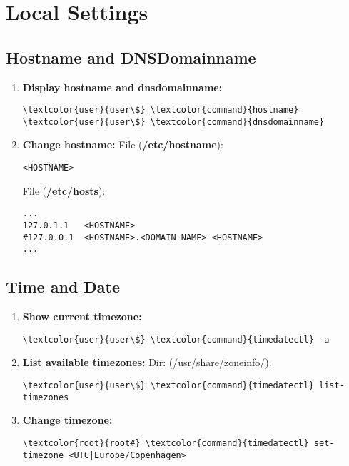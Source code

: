 \documentclass[10pt, a4paper, onecolumn, openany]{book} %
\begin{document}
\chapter{Local Settings}
\section{Hostname and DNSDomainname}
\begin{enumerate}
    \item \textbf{Display hostname and dnsdomainname:}
\begin{Verbatim}[commandchars=\\\{\}]
\textcolor{user}{user\$} \textcolor{command}{hostname}
\textcolor{user}{user\$} \textcolor{command}{dnsdomainname}
\end{Verbatim}
    \item \textbf{Change hostname:}
\newline File (\textbf{\textcolor{file}{/etc/hostname}}):
\begin{Verbatim}[commandchars=\\\{\}]
<HOSTNAME>
\end{Verbatim}
File (\textbf{\textcolor{file}{/etc/hosts}}):
\begin{Verbatim}[commandchars=\\\{\}]
...
127.0.1.1   <HOSTNAME>
#127.0.0.1  <HOSTNAME>.<DOMAIN-NAME> <HOSTNAME>
...
\end{Verbatim}
\end{enumerate}
\section{Time and Date}
\begin{enumerate}
    \item \textbf{Show current timezone:}
\begin{Verbatim}[commandchars=\\\{\}]
\textcolor{user}{user\$} \textcolor{command}{timedatectl} -a
\end{Verbatim}
    \item \textbf{List available timezones:}
    \newline Dir: (\textcolor{dir}{/usr/share/zoneinfo/}).
\begin{Verbatim}[commandchars=\\\{\}]
\textcolor{user}{user\$} \textcolor{command}{timedatectl} list-timezones
\end{Verbatim}
    \item \textbf{Change timezone:}
\begin{Verbatim}[commandchars=\\\{\}]
\textcolor{root}{root#} \textcolor{command}{timedatectl} set-timezone <UTC|Europe/Copenhagen>
\end{Verbatim}
\end{enumerate}
\end{document}
